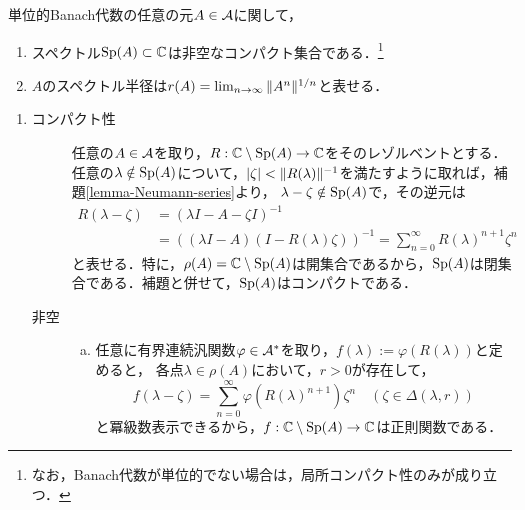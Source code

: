 \documentclass[uplatex,dvipdfmx]{jsreport}
\begin{document}
\begin{theorem}\label{thm-Spectrum-is-compact}
    単位的Banach代数の任意の元$A\in\mathcal{A}$に関して，
    \begin{enumerate}
        \item スペクトル$\mathrm{Sp}(A)\subset\mathbb{C}$は非空なコンパクト集合である．\footnote{なお，Banach代数が単位的でない場合は，局所コンパクト性のみが成り立つ．}
        \item $A$のスペクトル半径は$r(A)=\lim_{n\to\infty}\|A^n\|^{1/n}$と表せる．
    \end{enumerate}
\end{theorem}
\begin{Proof}\mbox{}
    \begin{enumerate}
        \item 
        \begin{description}
            \item[コンパクト性] 任意の$A\in\mathcal{A}$を取り，$R:\mathbb{C}\setminus\mathrm{Sp}(A)\to\mathbb{C}$をそのレゾルベントとする．
            任意の$\lambda\notin\mathrm{Sp}(A)$について，$\lvert\zeta\rvert<\|R(\lambda)\|^{-1}$を満たすように取れば，補題\ref{lemma-Neumann-series}より，
            $\lambda-\zeta\notin\mathrm{Sp}(A)$で，その逆元は
            \begin{align*}
                R(\lambda-\zeta)&=(\lambda I-A-\zeta I)^{-1}\\
                &=((\lambda I-A)(I-R(\lambda)\zeta))^{-1}=\sum^\infty_{n=0}R(\lambda)^{n+1}\zeta^n
            \end{align*}
            と表せる．特に，$\rho(A)=\mathbb{C}\setminus\mathrm{Sp}(A)$は開集合であるから，$\mathrm{Sp}(A)$は閉集合である．補題と併せて，$\mathrm{Sp}(A)$はコンパクトである．
            \item[非空]
            \begin{enumerate}[(a)]
                \item 任意に有界連続汎関数$\varphi\in\mathcal{A}^*$を取り，$f(\lambda):=\varphi(R(\lambda))$と定めると，
                各点$\lambda\in\rho(A)$において，$r>0$が存在して，
                \[f(\lambda-\zeta)=\sum^\infty_{n=0}\varphi(R(\lambda)^{n+1})\zeta^n\quad(\zeta\in\Delta(\lambda,r))\]
                と冪級数表示できるから，$f:\mathbb{C}\setminus\mathrm{Sp}(A)\to\mathbb{C}$は正則関数である．


\end{enumerate}
\end{description}
\end{enumerate}
\end{Proof}
\end{document}
